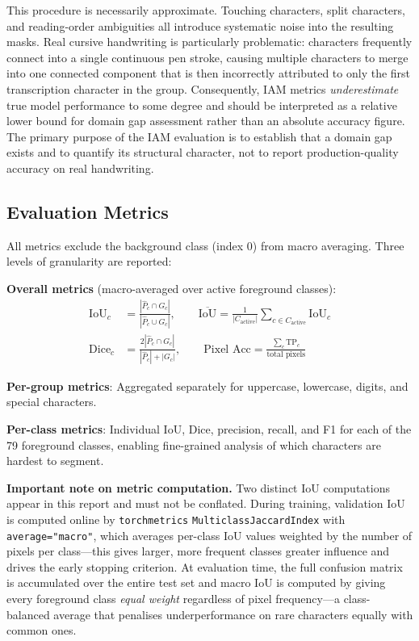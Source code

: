 \documentclass[a4paper,11pt]{article}
\begin{document}
This procedure is necessarily approximate. Touching characters, split characters, and
reading-order ambiguities all introduce systematic noise into the resulting masks.
Real cursive handwriting is particularly problematic: characters frequently connect
into a single continuous pen stroke, causing multiple characters to merge into one
connected component that is then incorrectly attributed to only the first transcription
character in the group. Consequently, IAM metrics \emph{underestimate} true model
performance to some degree and should be interpreted as a relative lower bound for domain
gap assessment rather than an absolute accuracy figure. The primary purpose of the IAM
evaluation is to establish that a domain gap exists and to quantify its structural
character, not to report production-quality accuracy on real handwriting.

\subsection{Evaluation Metrics}
\label{sec:metrics}

All metrics exclude the background class (index 0) from macro averaging. Three levels of
granularity are reported:

\medskip
\noindent\textbf{Overall metrics} (macro-averaged over active foreground classes):
\begin{align}
    \text{IoU}_c &= \frac{|\hat{P}_c \cap G_c|}{|\hat{P}_c \cup G_c|}, \qquad
    \overline{\text{IoU}} = \frac{1}{|C_{\text{active}}|}
    \sum_{c \in C_{\text{active}}} \text{IoU}_c
    \label{eq:iou} \\[6pt]
    \text{Dice}_c &= \frac{2|\hat{P}_c \cap G_c|}{|\hat{P}_c| + |G_c|}, \qquad
    \text{Pixel Acc} = \frac{\sum_c \text{TP}_c}{\text{total pixels}}
    \label{eq:dice_eval}
\end{align}

\noindent\textbf{Per-group metrics}: Aggregated separately for uppercase, lowercase,
digits, and special characters.

\noindent\textbf{Per-class metrics}: Individual IoU, Dice, precision, recall, and F1 for
each of the 79 foreground classes, enabling fine-grained analysis of which characters are
hardest to segment.

\medskip
\noindent\textbf{Important note on metric computation.} Two distinct IoU computations
appear in this report and must not be conflated. During training, validation IoU is
computed online by \texttt{torchmetrics} \texttt{MulticlassJaccardIndex} with
\texttt{average="macro"}, which averages per-class IoU values weighted by the number of
pixels per class---this gives larger, more frequent classes greater influence and drives
the early stopping criterion. At evaluation time, the full confusion matrix is accumulated
over the entire test set and macro IoU is computed by giving every foreground class
\emph{equal weight} regardless of pixel frequency---a class-balanced average that
penalises underperformance on rare characters equally with common ones.
\end{document}

